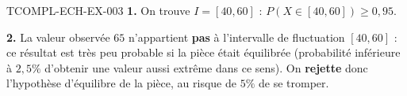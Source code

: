 \begin{corrige}{TCOMPL-ECH-EX-003}
\textbf{1.} On trouve $I=[40,60]$ : $P(X\in[40,60]) \geq 0{,}95$.

\textbf{2.} La valeur observée $65$ n'appartient \textbf{pas} à l'intervalle de fluctuation $[40,60]$ : ce résultat est très peu probable si la pièce était équilibrée (probabilité inférieure à $2{,}5\%$ d'obtenir une valeur aussi extrême dans ce sens). On \textbf{rejette} donc l'hypothèse d'équilibre de la pièce, au risque de $5\%$ de se tromper.
\end{corrige}
